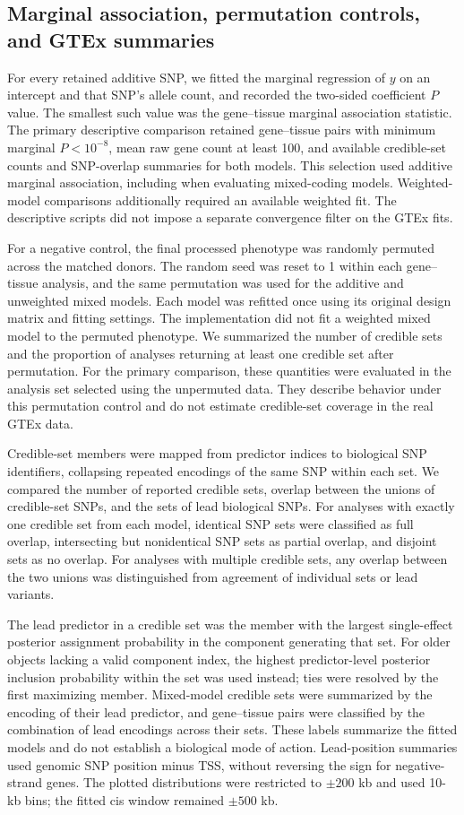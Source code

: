\documentclass[12pt]{article}
\begin{document}
\subsection{Marginal association, permutation controls, and GTEx summaries}
For every retained additive SNP, we fitted the marginal regression of
$y$ on an intercept and that SNP's allele count, and recorded the
two-sided coefficient $P$ value. The smallest such value was the
gene--tissue marginal association statistic. The primary descriptive
comparison retained gene--tissue pairs with minimum marginal $P<10^{-8}$,
mean raw gene count at least 100, and available credible-set counts and
SNP-overlap summaries for both models. This selection used additive
marginal association, including when evaluating mixed-coding models.
Weighted-model comparisons additionally required an available weighted
fit. The descriptive scripts did not impose a separate convergence
filter on the GTEx fits.

For a negative control, the final processed phenotype was randomly
permuted across the matched donors. The random seed was reset to 1
within each gene--tissue analysis, and the same permutation was used
for the additive and unweighted mixed models. Each model was refitted
once using its original design matrix and fitting settings. The
implementation did not fit a weighted mixed model to the permuted
phenotype. We summarized the number of credible sets and the proportion
of analyses returning at least one credible set after permutation.
For the primary comparison, these quantities were evaluated in the
analysis set selected using the unpermuted data. They describe behavior
under this permutation control and do not estimate credible-set
coverage in the real GTEx data.

Credible-set members were mapped from predictor indices to biological
SNP identifiers, collapsing repeated encodings of the same SNP within
each set. We compared the number of reported credible sets, overlap
between the unions of credible-set SNPs, and the sets of lead biological
SNPs. For analyses with exactly one credible set from each model,
identical SNP sets were classified as full overlap, intersecting but
nonidentical SNP sets as partial overlap, and disjoint sets as no overlap.
For analyses with multiple credible sets, any overlap between the two
unions was distinguished from agreement of individual sets or lead
variants.

The lead predictor in a credible set was the member with the largest
single-effect posterior assignment probability in the component
generating that set. For older objects lacking a valid component index,
the highest predictor-level posterior inclusion probability within the
set was used instead; ties were resolved by the first maximizing member.
Mixed-model credible sets were summarized by the encoding of their
lead predictor, and gene--tissue pairs were classified by the combination
of lead encodings across their sets. These labels summarize the fitted
models and do not establish a biological mode of action. Lead-position
summaries used genomic SNP position minus TSS, without reversing the
sign for negative-strand genes. The plotted distributions were restricted
to $\pm 200$ kb and used 10-kb bins; the fitted cis window remained
$\pm 500$ kb.
\end{document}
